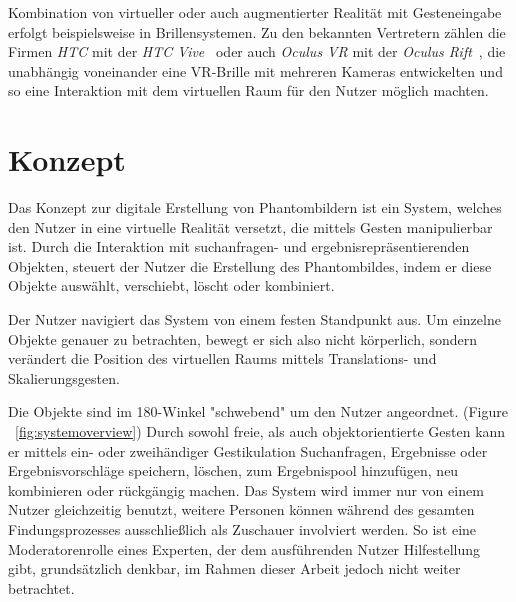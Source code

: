 \documentclass{sigchi-ext}
\begin{document}
Kombination von virtueller oder auch augmentierter Realität mit Gesteneingabe erfolgt beispielsweise in Brillensystemen. Zu den bekannten Vertretern zählen die Firmen \textit{HTC} mit der \textit{HTC Vive}~\cite{vive} oder auch \textit{Oculus VR} mit der \textit{Oculus Rift}~\cite{oculus}, die unabhängig voneinander eine VR-Brille mit mehreren Kameras entwickelten und so eine Interaktion mit dem virtuellen Raum für den Nutzer möglich machten.

\section{Konzept}

Das Konzept zur digitale Erstellung von Phantombildern ist ein System, welches den Nutzer in eine virtuelle Realität versetzt, die mittels Gesten manipulierbar ist. Durch die Interaktion mit suchanfragen- und ergebnisrepräsentierenden Objekten, steuert der Nutzer die Erstellung des Phantombildes, indem er diese Objekte auswählt, verschiebt, löscht oder kombiniert. 

Der Nutzer navigiert das System von einem festen Standpunkt aus. Um einzelne Objekte genauer zu betrachten, bewegt er sich also nicht körperlich, sondern verändert die Position des virtuellen Raums mittels Translations- und Skalierungsgesten.

Die Objekte sind im 180-Winkel "schwebend" um den Nutzer angeordnet. (Figure ~\ref{fig:systemoverview}) Durch sowohl freie, als auch objektorientierte Gesten kann er mittels ein- oder zweihändiger Gestikulation Suchanfragen, Ergebnisse oder Ergebnisvorschläge speichern, löschen, zum Ergebnispool hinzufügen, neu kombinieren oder rückgängig machen.
Das System wird immer nur von einem Nutzer gleichzeitig benutzt,
weitere Personen können während des gesamten Findungsprozesses
ausschließlich als Zuschauer involviert werden. So ist eine
Moderatorenrolle eines Experten, der dem ausführenden Nutzer Hilfestellung gibt, grundsätzlich denkbar, im Rahmen dieser Arbeit jedoch nicht weiter betrachtet.
\end{document}
